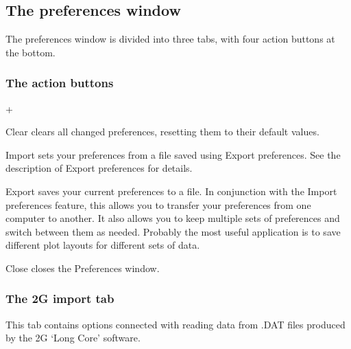 \documentclass[a4paper,british]{article}
\newcommand{\menuitemlabel}[1]{%
\mbox{\textsf{#1}}\hfil}
\newenvironment{menuitemlist}%
{\begin{list}{}{%
\renewcommand{\makelabel}{\menuitemlabel}%
\setlength{\labelwidth}{35pt}%
\setlength{\leftmargin}%
             {\labelwidth+\labelsep}}}%
{\end{list}}
\newcommand{\ppcmd}[1]{\textsf{#1}} %
\newcommand{\caps}[1]{\MakeTextUppercase{#1}} %
\begin{document}
\subsection{\label{sec:preferences}The preferences window}

The preferences window is divided into three tabs, with four
action buttons at the bottom.

\subsubsection{The action buttons}

\begin{menuitemlist}

\item[Clear] clears all changed preferences,
  resetting them to their default values.

\item[Import] sets your preferences from a
  file saved using \ppcmd{Export preferences}. See the description of
  \ppcmd{Export preferences} for details.

\item[Export] saves your current preferences
  to a file. In conjunction with the \ppcmd{Import preferences} feature, this
  allows you to transfer your preferences from one computer to another. It
  also allows you to keep multiple sets of preferences and switch between
  them as needed. Probably the most useful application is to save different
  plot layouts for different sets of data.

\item[Close] closes the Preferences window.

\end{menuitemlist}

\subsubsection{\label{sec:prefs-2g-import}The \ppcmd{2G import} tab}

This tab contains options connected with reading data from \caps{.dat} files
produced by the \caps{2g} `Long Core' software.
\end{document}
